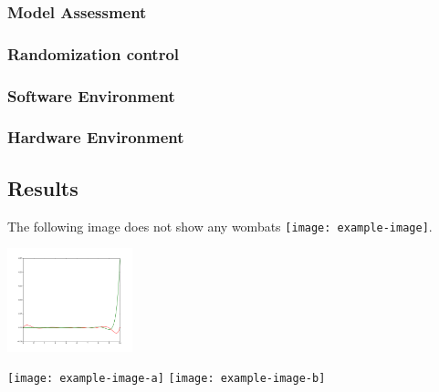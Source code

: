 \documentclass[12pt]{article}
\begin{document}
    \subsubsection{Model Assessment}
    
    \subsubsection{Randomization control}
    
    \subsubsection{Software Environment}
    
    \subsubsection{Hardware Environment}
    
    \subsection {Results}
    
    The following image does not show any wombats
    \texttt{[image: example-image]}.
      
    \includegraphics[height=3cm]{figure_1.png}
    
    \texttt{[image: example-image-a]} \texttt{[image: example-image-b]}
    
\end{document}
